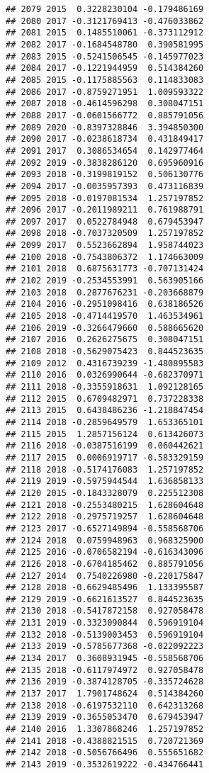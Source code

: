 \documentclass[
]{article}
\begin{document}
\begin{verbatim}
## 2079 2015  0.3228230104 -0.179486169
## 2080 2017 -0.3121769413 -0.476033862
## 2081 2015  0.1485510061 -0.373112912
## 2082 2017 -0.1684548780  0.390581995
## 2083 2015 -0.5241506545 -0.145977023
## 2084 2017 -0.1221944959  0.514384260
## 2085 2015 -0.1175885563  0.114833083
## 2086 2017 -0.8759271951  1.009593322
## 2087 2018 -0.4614596298  0.308047151
## 2088 2017 -0.0601566772  0.885791056
## 2089 2020 -0.8397328846  3.394850300
## 2090 2017 -0.0238618734  0.431849417
## 2091 2017  0.3086534654  0.142977464
## 2092 2019 -0.3838286120  0.695960916
## 2093 2018 -0.3199819152  0.506130776
## 2094 2017 -0.0035957393  0.473116839
## 2095 2018 -0.0197081534  1.257197852
## 2096 2017 -0.2011989211  0.761988791
## 2097 2017  0.0522784948  0.679453947
## 2098 2018 -0.7037320509  1.257197852
## 2099 2017  0.5523662894  1.958744023
## 2100 2018 -0.7543806372  1.174663009
## 2101 2018  0.6875631773 -0.707131424
## 2102 2019 -0.2534553991  0.563905166
## 2103 2018  0.2877676231 -0.203668879
## 2104 2016 -0.2951098416  0.638186526
## 2105 2018 -0.4714419570  1.463534961
## 2106 2019 -0.3266479660  0.588665620
## 2107 2016  0.2626275675  0.308047151
## 2108 2018 -0.5629075423  0.844523635
## 2109 2012  0.4316739239 -1.480895583
## 2110 2016  0.0326990644 -0.682370971
## 2111 2018 -0.3355918631  1.092128165
## 2112 2015  0.6709482971  0.737228338
## 2113 2015  0.6438486236 -1.218847454
## 2114 2018 -0.2859649579  1.653365101
## 2115 2015  1.2857156124  0.613426073
## 2116 2018 -0.0387516199  0.060442621
## 2117 2015  0.0006919717 -0.583329159
## 2118 2018 -0.5174176083  1.257197852
## 2119 2019 -0.5975944544  1.636858133
## 2120 2015 -0.1843328079  0.225512308
## 2121 2018 -0.2553480215  1.628604648
## 2122 2018 -0.2975719257  1.628604648
## 2123 2017 -0.6527149894 -0.558568706
## 2124 2018  0.0759948963  0.968325900
## 2125 2016 -0.0706582194 -0.616343096
## 2126 2018 -0.6704185462  0.885791056
## 2127 2014  0.7540226980 -0.220175847
## 2128 2018 -0.6629485496  1.133395587
## 2129 2019 -0.6621613527  0.844523635
## 2130 2018 -0.5417872158  0.927058478
## 2131 2019 -0.3323090844  0.596919104
## 2132 2018 -0.5139003453  0.596919104
## 2133 2019 -0.5785677368 -0.022092223
## 2134 2017  0.3608931945 -0.558568706
## 2135 2018 -0.6117974972  0.927058478
## 2136 2019 -0.3874128705 -0.335724628
## 2137 2017  1.7901748624  0.514384260
## 2138 2018 -0.6197532110  0.642313268
## 2139 2019 -0.3655053470  0.679453947
## 2140 2016  1.3307868246  1.257197852
## 2141 2018 -0.4388821515  0.720721369
## 2142 2018 -0.5056766496  0.555651682
## 2143 2019 -0.3532619222 -0.434766441

\end{verbatim}
\end{document}
